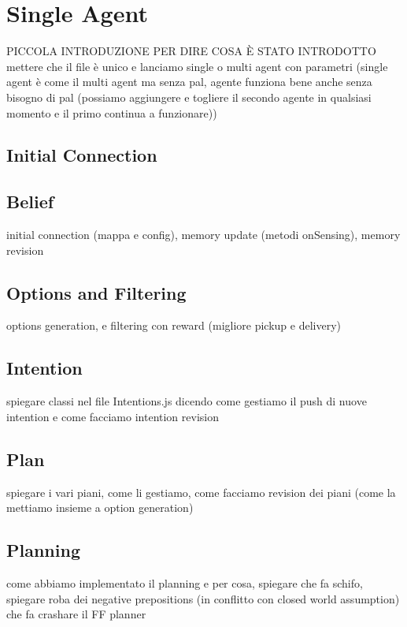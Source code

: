 \section{Single Agent}

    PICCOLA INTRODUZIONE PER DIRE COSA È STATO INTRODOTTO
    mettere che il file è unico e lanciamo single o multi agent con parametri (single agent è come il multi agent ma senza pal, agente funziona bene anche senza bisogno di pal (possiamo aggiungere e togliere il secondo agente in qualsiasi momento e il primo continua a funzionare))

    \subsection{Initial Connection}

    \subsection{Belief}
        initial connection (mappa e config), memory update (metodi onSensing), memory revision

    \subsection{Options and Filtering}
        options generation, e filtering con reward (migliore pickup e delivery)

    \subsection{Intention}
        spiegare classi nel file Intentions.js dicendo come gestiamo il push di nuove intention e come facciamo intention revision

    \subsection{Plan}
        spiegare i vari piani, come li gestiamo, come facciamo revision dei piani (come la mettiamo insieme a option generation)

    \subsection{Planning}
        come abbiamo implementato il planning e per cosa, spiegare che fa schifo, spiegare roba dei negative prepositions (in conflitto con closed world assumption) che fa crashare il FF planner
    
    
    
    


